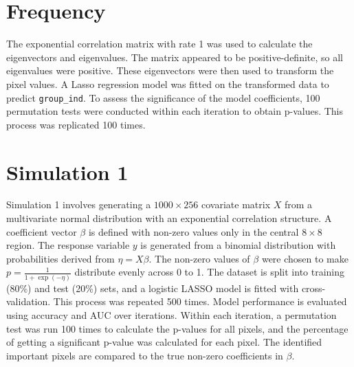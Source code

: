 \documentclass[12pt]{article}
\begin{document}
\section*{Frequency}

The exponential correlation matrix with rate 1 was used to calculate the eigenvectors and eigenvalues. The matrix appeared to be positive-definite, so all eigenvalues were positive. These eigenvectors were then used to transform the pixel values. A Lasso regression model was fitted on the transformed data to predict \texttt{group\_ind}. To assess the significance of the model coefficients, 100 permutation tests were conducted within each iteration to obtain p-values. This process was replicated 100 times.

\clearpage

\section*{Simulation 1}

Simulation 1 involves generating a \( 1000 \times 256 \) covariate matrix \(X\) from a multivariate normal distribution with an exponential correlation structure. A coefficient vector \(\beta\) is defined with non-zero values only in the central \( 8 \times 8 \) region. The response variable \(y\) is generated from a binomial distribution with probabilities derived from \(\eta = X\beta\). The non-zero values of \(\beta\) were chosen to make \(p = \frac{1}{1 + \exp(-\eta)}\) distribute evenly across 0 to 1. The dataset is split into training (80\%) and test (20\%) sets, and a logistic LASSO model is fitted with cross-validation. This process was repeated 500 times. Model performance is evaluated using accuracy and AUC over iterations. Within each iteration, a permutation test was run 100 times to calculate the p-values for all pixels, and the percentage of getting a significant p-value was calculated for each pixel. The identified important pixels are compared to the true non-zero coefficients in \(\beta\).
\end{document}
